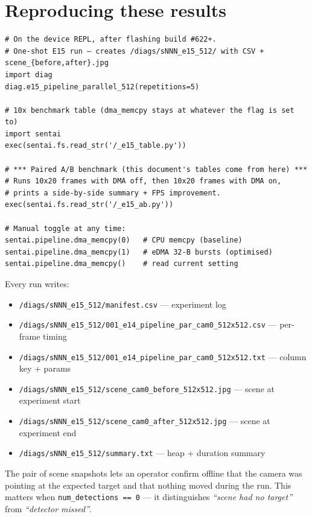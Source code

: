 \section{Reproducing these results}\label{reproducing-these-results}

\begin{verbatim}
# On the device REPL, after flashing build #622+.
# One-shot E15 run — creates /diags/sNNN_e15_512/ with CSV + scene_{before,after}.jpg
import diag
diag.e15_pipeline_parallel_512(repetitions=5)

# 10x benchmark table (dma_memcpy stays at whatever the flag is set to)
import sentai
exec(sentai.fs.read_str('/_e15_table.py'))

# *** Paired A/B benchmark (this document's tables come from here) ***
# Runs 10x20 frames with DMA off, then 10x20 frames with DMA on,
# prints a side-by-side summary + FPS improvement.
exec(sentai.fs.read_str('/_e15_ab.py'))

# Manual toggle at any time:
sentai.pipeline.dma_memcpy(0)   # CPU memcpy (baseline)
sentai.pipeline.dma_memcpy(1)   # eDMA 32-B bursts (optimised)
sentai.pipeline.dma_memcpy()    # read current setting
\end{verbatim}

Every run writes:

\begin{itemize}
\tightlist
\item
  \texttt{/diags/sNNN\_e15\_512/manifest.csv} --- experiment log
\item
  \texttt{/diags/sNNN\_e15\_512/001\_e14\_pipeline\_par\_cam0\_512x512.csv}
  --- per-frame timing
\item
  \texttt{/diags/sNNN\_e15\_512/001\_e14\_pipeline\_par\_cam0\_512x512.txt}
  --- column key + params
\item
  \texttt{/diags/sNNN\_e15\_512/scene\_cam0\_before\_512x512.jpg} ---
  scene at experiment start
\item
  \texttt{/diags/sNNN\_e15\_512/scene\_cam0\_after\_512x512.jpg} ---
  scene at experiment end
\item
  \texttt{/diags/sNNN\_e15\_512/summary.txt} --- heap + duration summary
\end{itemize}

The pair of scene snapshots lets an operator confirm offline that the
camera was pointing at the expected target and that nothing moved during
the run. This matters when \texttt{num\_detections\ ==\ 0} --- it
distinguishes \emph{``scene had no target''} from \emph{``detector
missed''}.

